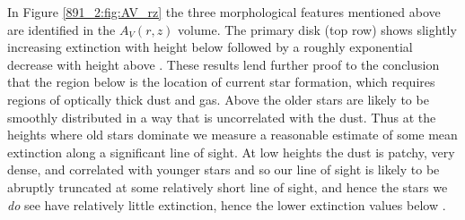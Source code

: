 In Figure \ref{891_2:fig:AV_rz} the three morphological features
mentioned above are identified in the $A_V(r,z)$ volume. The primary
disk (top row) shows slightly increasing extinction with height below
 followed by a roughly exponential decrease with
height above . These results lend further proof to
the conclusion that the region below  is the location of
current star formation, which requires regions of optically thick dust
and gas. Above  the older stars are likely to be
smoothly distributed in a way that is uncorrelated with the dust. Thus
at the heights where old stars dominate we measure a reasonable
estimate of some mean extinction along a significant line of sight. At
low heights the dust is patchy, very dense, and correlated with
younger stars and so our line of sight is likely to be abruptly
truncated at some relatively short line of sight, and hence the stars
we \emph{do} see have relatively little extinction, hence the lower
extinction values below .



